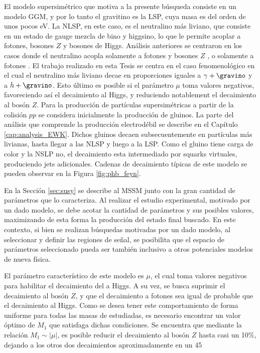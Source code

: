 El modelo supersimétrico que motiva a la presente búsqueda consiste en un modelo GGM, y por lo tanto el gravitino es la LSP, cuya masa es del orden de unos pocos eV. La NLSP, en este caso, es el neutralino más liviano, que consiste en un estado de gauge mezcla de bino y higgsino, lo que le permite acoplar a fotones, bosones $Z$ y bosones de Higgs.
Análisis anteriores se centraron en los casos donde el neutralino acopla solamente a fotones y bosones $Z$ \cite{Alonso:2147473, tesis_joaco, Collaboration:2198651, tesis_tony}, o solamente a fotones \cite{Jinnouchi:2233741}. El trabajo realizado en esta Tesis se centra en el caso fenomenológico en el cual el neutralino más liviano decae en proporciones iguales a $\gamma+\gravino$ y a $h+\gravino$. Esto último es posible si el parámetro $\mu$ toma valores negativos, favoreciendo así el decaimiento al Higgs, y reduciendo notablement
el decaimiento al bosón $Z$.
Para la producción de partículas supersimétricas a partir de la colisión $pp$ se considera inicialmente la producción de gluinos. La parte del análisis que comprende la producción electrodébil se describe en el Capítulo \ref{cap:analysis_EWK}. Dichos gluinos decaen subsecuentemente en partículas más livianas, hasta llegar a las NLSP y luego a la LSP.
Como el gluino tiene carga de color y la NSLP no, el decaimiento esta intermediado por squarks virtuales, produciendo jets adicionales.
Cadenas de decaimiento típicas de este modelo se pueden observar en la Figura \ref{fig:phb_feyn}.


En la Sección \ref{sec:susy} se describe al MSSM junto con la gran cantidad de parámetros que lo caracteriza. 
Al realizar el estudio experimental, motivado por un dado modelo, se debe acotar la cantidad de parámetros y sus posibles valores, maximizando de esta forma la producción del estado final buscado. En este contexto, si bien se realizan búsquedas motivadas por un dado modelo, al seleccionar y definir las regiones de señal, se posibilita que el espacio de parámetros seleccionado pueda ser también inclusivo a otros potenciales modelos de nueva física. 

El parámetro característico de este modelo es $\mu$, el cual toma valores negativos para habilitar el decaimiento del \ninoone a Higgs. A su vez, se busca suprimir el decaimiento al bosón $Z$, y que el decaimiento a fotones sea igual de probable que el decaimiento al Higgs. Como se desea tener este comportamiento de forma uniforme para todas las masas de \ninoone estudiadas, es necesario encontrar un valor óptimo de $M_1$ que satisfaga dichas condiciones. Se encuentra que mediante la relación $M_1 \sim |\mu|$,
es posible reducir el decaimiento al bosón $Z$ hasta casi un 10\%, dejando a los otros dos decaimientos aproximadamente en un 45

